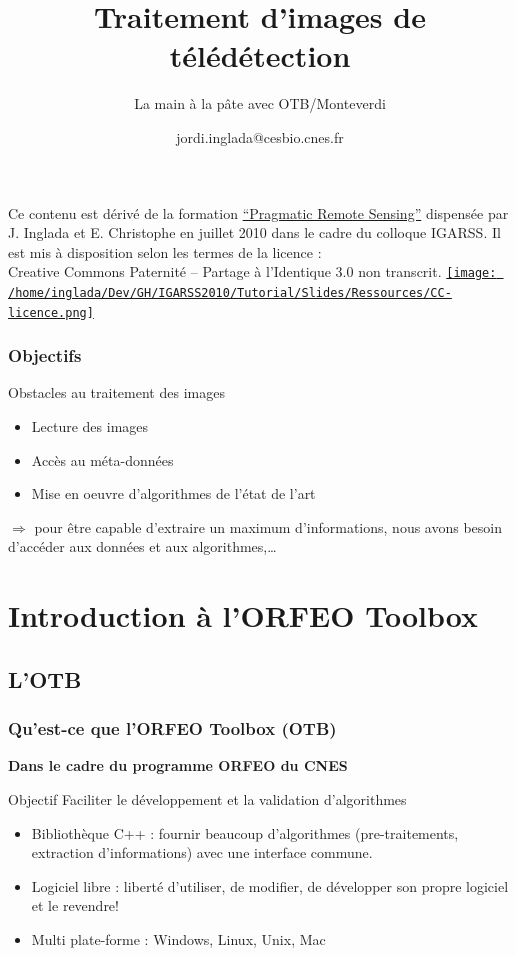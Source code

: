 \documentclass[compress,handout]{beamer}
\title{Traitement d'images de télédétection}
\subtitle{La main à la pâte avec OTB/Monteverdi} %
\author
{jordi.inglada@cesbio.cnes.fr}
\institute[Cesbio] %
{\textsc{Centre d'Études Spatiales de la Biosphère, Toulouse, France}}
\date{}
\begin{document}
\begin{frame}
  \titlepage
  \begin{center}
{\tiny Ce contenu est dérivé de la formation \href{http://www.orfeo-toolbox.org/packages/PragmaticRemoteSensing-handout.pdf}{``Pragmatic Remote
  Sensing''} dispensée par J. Inglada et E. Christophe en juillet 2010
  dans le cadre du colloque IGARSS. Il est mis à disposition selon les termes de la licence :\\
Creative Commons Paternité – Partage à l’Identique 3.0 non transcrit.} \href{http://creativecommons.org/licenses/by-sa/3.0/}{\texttt{[image: /home/inglada/Dev/GH/IGARSS2010/Tutorial/Slides/Ressources/CC-licence.png]}}    
  \end{center}

\end{frame}

\begin{frame}
\frametitle{Objectifs}
\begin{block}{Obstacles au traitement des images}
\begin{itemize}
 \item Lecture des images
 \item Accès au méta-données
 \item Mise en oeuvre d'algorithmes de l'état de l'art
\end{itemize}
\end{block}
$\Rightarrow$ pour être capable \alert{d'extraire un maximum
  d'informations}, nous avons besoin \alert{d'accéder} aux données et
aux algorithmes,\ldots
\end{frame}


\section{Introduction à l'ORFEO Toolbox}



\subsection{L'OTB}
\begin{frame}
\frametitle{Qu'est-ce que l'ORFEO Toolbox (OTB)}

\textbf{Dans le cadre du programme ORFEO du CNES}
\begin{alertblock}{Objectif}
Faciliter le développement et la validation d'algorithmes
\end{alertblock}
\begin{block}{}
\begin{itemize}
 \item Bibliothèque C++ : fournir beaucoup d'algorithmes
   (pre-traitements, extraction d'informations) avec une interface commune.
 \item Logiciel libre : liberté d'utiliser, de modifier, de développer
   son propre logiciel et le revendre!
 \item Multi plate-forme : Windows, Linux, Unix, Mac
\end{itemize}
\end{block}
\end{frame}
\end{document}
